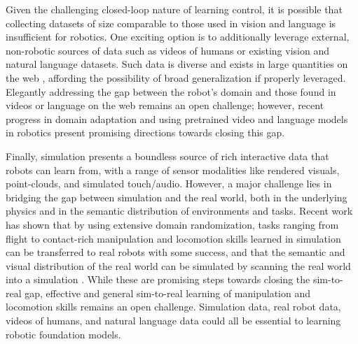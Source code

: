Given the challenging closed-loop nature of learning control, it is possible that collecting datasets of size comparable to those used in vision and language is insufficient for robotics. One exciting option is to additionally leverage external, non-robotic sources of data such as videos of humans or existing vision and natural language datasets. Such data is diverse and exists in large quantities on the web \citep{deng2009imagenet,Lee2012DiscoveringIP, caba2015activitynet, Goyal2017TheS, damen2018kitchens, gao2020pile,grauman2021ego4d}, affording the possibility of broad generalization if properly leveraged. Elegantly addressing the gap between the robot’s domain and those found in videos or language on the web remains an open challenge; however, recent progress in domain adaptation \citep{Smith2019AVIDLM, Schmeckpeper2020ReinforcementLW} and using pretrained video and language models in robotics \citep{lynch2020grounding, shao2020concept2robot, chen2021generalizable} present promising directions towards closing this gap.

Finally, simulation presents a boundless source of rich interactive data that robots can learn from, with a range of sensor modalities like rendered visuals, point-clouds, and simulated touch/audio. However, a major challenge lies in bridging the gap between simulation and the real world, both in the underlying physics and in the semantic distribution of environments and tasks. Recent work has shown that by using extensive domain randomization, tasks ranging from flight \citep{Sadeghi2017CAD2RLRS} to contact-rich manipulation \citep{Mahler2017DexNet2D, OpenAI2019SolvingRC} and locomotion \citep{RoboImitationPeng20, hwangbo2019learning} skills learned in simulation can be transferred to real robots with some success, and that the semantic and visual distribution of the real world can be simulated by scanning the real world into a simulation \citep{Matterport3D, Kolve2017AI2THORAI, embodied, szot2021habitat, shen2021igibson}. While these are promising steps towards closing the sim-to-real gap, effective and general sim-to-real learning of manipulation and locomotion skills remains an open challenge. Simulation data, real robot data, videos of humans, and natural language data could all be essential to learning robotic foundation models.

